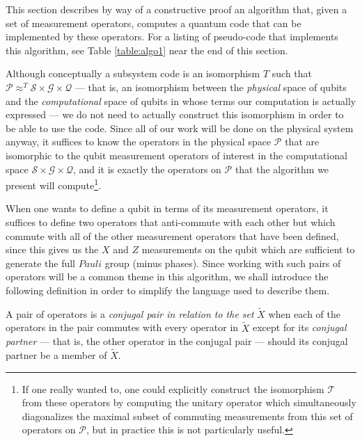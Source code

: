 \documentclass[twocolumn,showpacs,preprintnumbers,amsmath,amssymb,nofootinbib,pra,floatfix]{revtex4-1}
\newenvironment{definition}[1][Definition]{\begin{trivlist}
\item[\hskip \labelsep {\bfseries #1}]}{\end{trivlist}}
\newenvironment{remark}[1][Remark]{\begin{trivlist}
\item[\hskip \labelsep {\bfseries #1}]}{\end{trivlist}}
\newcommand{\set}{\tilde}
\begin{document}
\begin{remark}
This section describes by way of a constructive proof an algorithm that, given a set of measurement operators, computes a quantum code that can be implemented by these operators.  For a listing of pseudo-code that implements this algorithm, see Table \ref{table:algo1} near the end of this section.
\end{remark}
Although conceptually a subsystem code is an isomorphism $T$ such that  $\mathscr{P}\approx^T \mathscr{S}\times\mathscr{G}\times\mathscr{Q}$ --- that is, an isomorphism between the \emph{physical} space of qubits and the \emph{computational} space of qubits in whose terms our computation is actually expressed --- we do not need to actually construct this isomorphism in order to be able to use the code.  Since all of our work will be done on the physical system anyway, it suffices to know the operators in the physical space $\mathscr{P}$ that are isomorphic to the qubit measurement operators of interest in the computational space $\mathscr{S}\times\mathscr{G}\times\mathscr{Q}$, and it is exactly the operators on $\mathscr{P}$ that the algorithm we present will compute\footnote{If one really wanted to, one could explicitly construct the isomorphism $\mathscr{T}$ from these operators by computing the unitary operator which simultaneously diagonalizes the maximal subset of commuting measurements from this set of operators on $\mathscr{P}$, but in practice this is not particularly useful.}.

When one wants to define a qubit in terms of its measurement operators, it suffices to define two operators that anti-commute with each other but which commute with all of the other measurement operators that have been defined, since this gives us the $X$ and $Z$ measurements on the qubit which are sufficient to generate the full $Pauli$ group (minus phases).  Since working with such pairs of operators will be a common theme in this algorithm, we shall introduce the following definition in order to simplify the language used to describe them.

\begin{definition} A pair of operators is a \emph{conjugal pair in relation to the set} $\set X$ when each of the operators in the pair commutes with every operator in $\set X$ except for its \emph{conjugal partner} --- that is, the other operator in the conjugal pair --- should its conjugal partner be a member of $\set X$.
\label{conjugal-pair-definition}
\end{definition}
\end{document}
